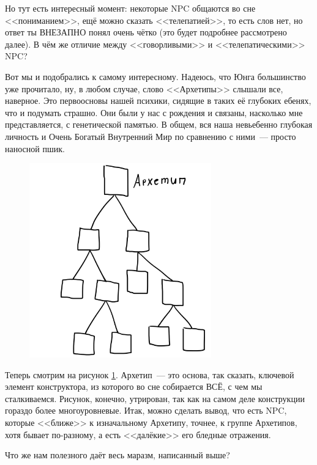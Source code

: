 \documentclass[a4paper,14pt,oneside]{memoir}
\begin{document}
Но тут есть интересный момент: некоторые NPC общаются во сне <<пониманием>>, ещё можно сказать <<телепатией>>, то есть слов нет, но ответ ты ВНЕЗАПНО понял очень чётко (это будет подробнее рассмотрено далее). В чём же отличие между <<говорливыми>> и <<телепатическими>> NPC?

Вот мы и подобрались к самому интересному. Надеюсь, что Юнга большинство уже прочитало, ну, в любом случае, слово <<Архетипы>> слышали все, наверное. Это первоосновы нашей психики, сидящие в таких её глубоких ебенях, что и подумать страшно. Они были у нас с рождения и связаны, насколько мне представляется, с генетической памятью. В общем, вся наша невьебенно глубокая личность и Очень Богатый Внутренний Мир по сравнению с ними~--- просто наносной пшик.
 
\begin{figure}[h!]
\begin{center}
\includegraphics[width=0.7\textwidth]{ris81.png}
\end{center}
\caption{}
\label{archt}
\end{figure}

Теперь смотрим на рисунок \ref{archt}. Архетип~--- это основа, так сказать, ключевой элемент конструктора, из которого во сне собирается ВСЁ, с чем мы сталкиваемся. Рисунок, конечно, утрирован, так как на самом деле конструкции гораздо более многоуровневые. Итак, можно сделать вывод, что есть NPC, которые <<ближе>> к изначальному Архетипу, точнее, к группе Архетипов, хотя бывает по-разному, а есть <<далёкие>> его бледные отражения.

Что же нам полезного даёт весь маразм, написанный выше?
\end{document}

